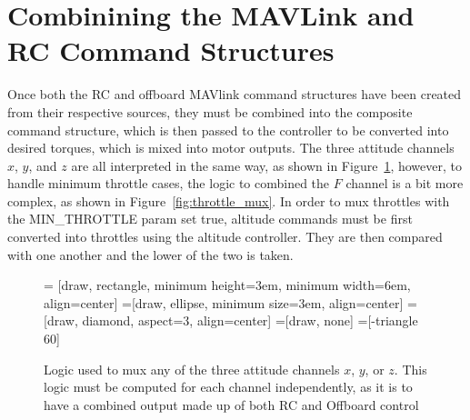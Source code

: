 \documentclass[paper=a4, fontsize=11pt]{scrartcl} %
\begin{document}
\section{Combinining the MAVLink and RC Command Structures}

Once both the RC and offboard MAVlink command structures have been created from their respective sources, they must be combined into the composite command structure, which is then passed to the controller to be converted into desired torques, which is mixed into motor outputs.  The three attitude channels $x$, $y$, and $z$ are all interpreted in the same way, as shown in Figure~\ref{fig:attitude_mux}, however, to handle minimum throttle cases, the logic to combined the $F$ channel is a bit more complex, as shown in Figure~\ref{fig:throttle_mux}.  In order to mux throttles with the MIN\_THROTTLE param set true, altitude commands must be first converted into throttles using the altitude controller.  They are then compared with one another and the lower of the two is taken.

\begin{figure}[h]
\centering
	 = [draw, rectangle, 
    					minimum height=3em, minimum width=6em, align=center]
  =[draw, ellipse, minimum size=3em,
    					align=center]
  =[draw, diamond, aspect=3, align=center]
  =[draw, none]
  =[-triangle 60]

  \begin{adjustbox}{max size={\textwidth}{\textheight}}
  \end{adjustbox}

  \caption{Logic used to mux any of the three attitude channels $x$, $y$, or $z$.  This logic must be computed for each channel independently, as it is to have a combined output made up of both RC and Offboard control}
  \label{fig:attitude_mux}
\end{figure}
\end{document}
